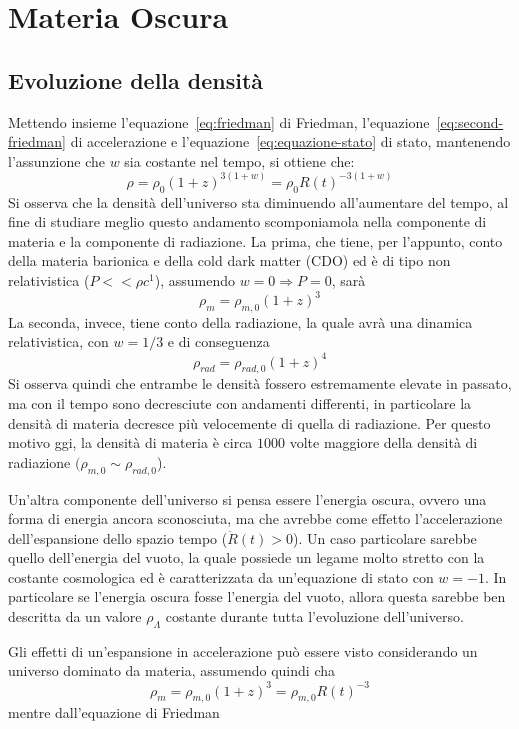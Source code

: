 \section{Materia Oscura}\label{sec:materia-oscura}
\subsection{Evoluzione della densità}\label{sec:evoluazione-densita}
Mettendo insieme l'equazione~\ref{eq:friedman} di Friedman, l'equazione~\ref{eq:second-friedman} di accelerazione e l'equazione~\ref{eq:equazione-stato} di stato, mantenendo l'assunzione che $w$ sia costante nel tempo, si ottiene che:
\[
    \rho = \rho_0 (1+z)^{3(1+w)} = \rho_0 R(t)^{-3(1+w)}
\]
Si osserva che la densità dell'universo sta diminuendo all'aumentare del tempo, al fine di studiare meglio questo andamento scomponiamola nella componente di materia e la componente di radiazione. La prima, che tiene, per l'appunto, conto della materia barionica e della cold dark matter (CDO) ed è di tipo non relativistica ($P<<\rho c^1$), assumendo $w = 0 \Rightarrow P=0$, sarà
\[
    \rho_m = \rho_{m,0}(1+z)^3
\]
La seconda, invece, tiene conto della radiazione, la quale avrà una dinamica relativistica, con $w = 1/3$ e di conseguenza
\[
    \rho_{rad} = \rho_{rad, 0}(1+z)^4
\]
Si osserva quindi che entrambe le densità fossero estremamente elevate in passato, ma con il tempo sono decresciute con andamenti differenti, in particolare la densità di materia decresce più velocemente di quella di radiazione. Per questo motivo ggi, la densità di materia è circa $1000$ volte maggiore della densità di radiazione $(\rho_{m,0} \sim \rho_{rad, 0}$).

Un'altra componente dell'universo si pensa essere l'energia oscura, ovvero una forma di energia ancora sconosciuta, ma che avrebbe come effetto l'accelerazione dell'espansione dello spazio tempo ($\ddot{R}(t)>0$). Un caso particolare sarebbe quello dell'energia del vuoto, la quale possiede un legame molto stretto con la costante cosmologica ed è caratterizzata da un'equazione di stato con $w = -1$. In particolare se l'energia oscura fosse l'energia del vuoto, allora questa sarebbe ben descritta da un valore $\rho_{\Lambda}$ costante durante tutta l'evoluzione dell'universo.

Gli effetti di un'espansione in accelerazione può essere visto considerando un universo dominato da materia, assumendo quindi cha
\[
    \rho_{m} = \rho_{m, 0}{(1+z)}^3 = \rho_{m,0}{R(t)}^{-3}
\]
mentre dall'equazione di Friedman 
